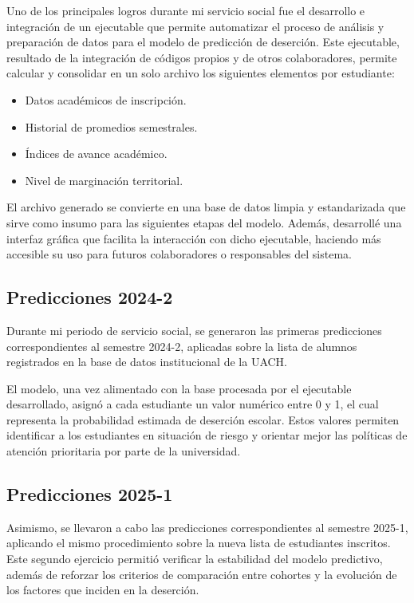 \documentclass[10pt,a4paper]{report}
\begin{document}
Uno de los principales logros durante mi servicio social fue el desarrollo e integración de un ejecutable que permite automatizar el proceso de análisis y preparación de datos para el modelo de predicción de deserción. Este ejecutable, resultado de la integración de códigos propios y de otros colaboradores, permite calcular y consolidar en un solo archivo los siguientes elementos por estudiante:

\begin{itemize}
\item Datos académicos de inscripción.
\item Historial de promedios semestrales.
\item Índices de avance académico.
\item Nivel de marginación territorial.
\end{itemize}

El archivo generado se convierte en una base de datos limpia y estandarizada que sirve como insumo para las siguientes etapas del modelo. Además, desarrollé una interfaz gráfica que facilita la interacción con dicho ejecutable, haciendo más accesible su uso para futuros colaboradores o responsables del sistema.

\subsection{Predicciones 2024-2}

Durante mi periodo de servicio social, se generaron las primeras predicciones correspondientes al semestre 2024-2, aplicadas sobre la lista de alumnos registrados en la base de datos institucional de la UACH.

\bigskip

El modelo, una vez alimentado con la base procesada por el ejecutable desarrollado, asignó a cada estudiante un valor numérico entre 0 y 1, el cual representa la probabilidad estimada de deserción escolar. Estos valores permiten identificar a los estudiantes en situación de riesgo y orientar mejor las políticas de atención prioritaria por parte de la universidad.

\subsection{Predicciones 2025-1}

Asimismo, se llevaron a cabo las predicciones correspondientes al semestre 2025-1, aplicando el mismo procedimiento sobre la nueva lista de estudiantes inscritos. Este segundo ejercicio permitió verificar la estabilidad del modelo predictivo, además de reforzar los criterios de comparación entre cohortes y la evolución de los factores que inciden en la deserción.
\end{document}
